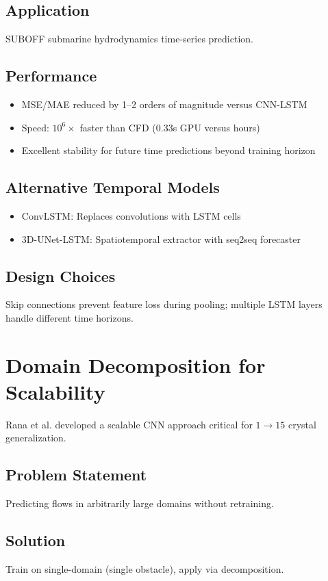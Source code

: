 \subsection{Application}
SUBOFF submarine hydrodynamics time-series prediction.

\subsection{Performance}
\begin{itemize}
    \item MSE/MAE reduced by 1--2 orders of magnitude versus CNN-LSTM
    \item Speed: $10^6\times$ faster than CFD (0.33s GPU versus hours)
    \item Excellent stability for future time predictions beyond training horizon
\end{itemize}

\subsection{Alternative Temporal Models}
\begin{itemize}
    \item ConvLSTM: Replaces convolutions with LSTM cells
    \item 3D-UNet-LSTM: Spatiotemporal extractor with seq2seq forecaster
\end{itemize}

\subsection{Design Choices}
Skip connections prevent feature loss during pooling; multiple LSTM layers handle different time horizons.

\section{Domain Decomposition for Scalability}

Rana et al. \cite{rana2024} developed a scalable CNN approach critical for $1 \rightarrow 15$ crystal generalization.

\subsection{Problem Statement}
Predicting flows in arbitrarily large domains without retraining.

\subsection{Solution}
Train on single-domain (single obstacle), apply via decomposition.

